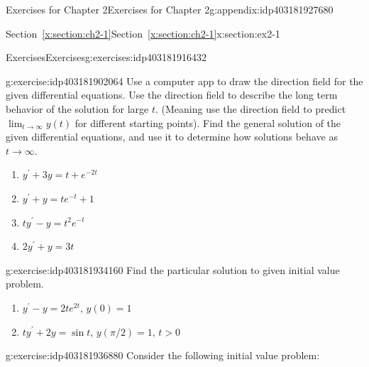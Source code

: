 \documentclass[oneside,10pt,]{book}
\newcommand{\xreffont}{\relax}
\numberwithin{equation}{section}
\numberwithin{equation}{section}
\begin{document}
\begin{appendixptx}{Exercises for Chapter 2}{}{Exercises for Chapter 2}{}{}{g:appendix:idp403181927680}
%
%
\typeout{************************************************}
\typeout{Section C.1 Section~{\xreffont\ref*{x:section:ch2-1}}}
\typeout{************************************************}
%
\begin{sectionptx}{Section~{\xreffont\ref*{x:section:ch2-1}}}{}{Section~{\xreffont\ref*{x:section:ch2-1}}}{}{}{x:section:ex2-1}
%
%
\typeout{************************************************}
\typeout{************************************************}
%
\begin{exercises-subsection-numberless}{Exercises}{}{Exercises}{}{}{g:exercises:idp403181916432}
\begin{divisionexercise}{1}{}{}{g:exercise:idp403181902064}%
Use a computer app to draw the direction field for the given differential equations. Use the direction field to describe the long term behavior of the solution for large \(t\). (Meaning use the direction field to predict \(\lim_{t\to\infty}y(t)\) for different starting points). Find the general solution of the given differential equations, and use it to determine how solutions behave as \(t\to\infty\).%
%
\begin{enumerate}[label=(\alph*)]
\item{}\(\displaystyle y^{\prime}+3y=t+e^{-2t}\)%
\item{}\(\displaystyle y^{\prime}+y=te^{-t}+1\)%
\item{}\(\displaystyle ty^{\prime}-y=t^{2}e^{-t}\)%
\item{}\(\displaystyle 2y^{\prime}+y=3t\)%
\end{enumerate}
\end{divisionexercise}%
\begin{divisionexercise}{2}{}{}{g:exercise:idp403181934160}%
Find the particular solution to given initial value problem.%
%
\begin{enumerate}[label=(\alph*)]
\item{}\(y^{\prime}-y=2te^{2t}\), \(y(0)=1\)%
\item{}\(ty^{\prime}+2y=\sin t\), \(y\left(\pi/2\right)=1\), \(t>0\)%
\end{enumerate}
\end{divisionexercise}%
\begin{divisionexercise}{3}{}{}{g:exercise:idp403181936880}%
Consider the following initial value problem:%
\begin{equation*}

\end{equation*}
\end{divisionexercise}
\end{exercises-subsection-numberless}
\end{sectionptx}
\end{appendixptx}
\end{document}
